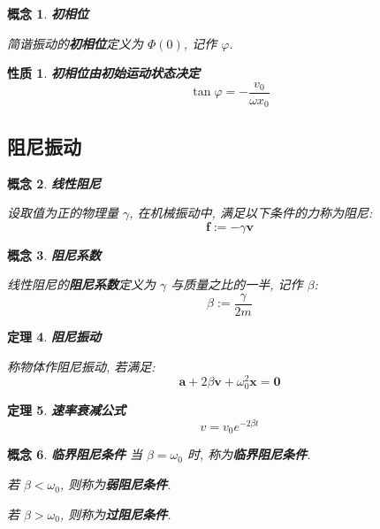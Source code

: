 \documentclass[UTF8]{ctexart}
\newcommand{\<}{\langle}
\renewcommand{\>}{\rangle}                              %
\newenvironment{dfn_box}{
    \begin{tcolorbox}[enhanced, colback=dfn_green2, boxrule=0pt, frame hidden,
        borderline west={0.7mm}{0.1mm}{dfn_green1},breakable]
    }
    {\end{tcolorbox}}
\newenvironment{thm_box}{
    \begin{tcolorbox}[enhanced, colback=thm_blue2, boxrule=0pt, frame hidden,
        borderline west={0.7mm}{0.1mm}{thm_blue1},breakable]
    }
    {\end{tcolorbox}}
\newenvironment{ppt_box}{
    \begin{tcolorbox}[enhanced, colback=ppt_pink2, boxrule=0pt, frame hidden,
        borderline west={0.7mm}{0.1mm}{ppt_pink1},breakable]
    }
    {\end{tcolorbox}}
\theoremstyle{MyStyle} %
\newtheorem{definition}{概念}[subsection]
\newenvironment{cpt}{\begin{dfn_box}\begin{definition}}{\end{definition}\end{dfn_box}}
\newtheorem{theorem}[definition]{定理}
\newenvironment{thm}{\begin{thm_box}\begin{theorem}}{\end{theorem}\end{thm_box}}
\newtheorem{property}{性质}[definition]
\newenvironment{ppt}{\begin{ppt_box}\begin{property}}{\end{property}\end{ppt_box}}
\begin{document}
            \begin{cpt}
                \textbf{初相位}

                简谐振动的\textbf{初相位}定义为 \(\Phi(0)\), 记作 \(\varphi\). 
            \end{cpt}
            
            \begin{ppt}
                \textbf{初相位由初始运动状态决定}
                \[\tan\varphi=-\frac{v_0}{\omega x_0}\]
            \end{ppt}

        \subsection{阻尼振动}
            
            \begin{cpt}
                \textbf{线性阻尼}

                设取值为正的物理量 \(\gamma\), 在机械振动中, 满足以下条件的力称为阻尼: 
                \[\bm{f}:=-\gamma\bm{v}\]
            \end{cpt}
            
            \begin{cpt}
                \textbf{阻尼系数}

                线性阻尼的\textbf{阻尼系数}定义为 \(\gamma\) 与质量之比的一半, 记作 \(\beta\): 
                \[\beta:=\frac{\gamma}{2m}\]
            \end{cpt}
            
            \begin{thm}
                \textbf{阻尼振动}

                称物体作阻尼振动, 若满足: 
                \[\bm{a}+2\beta\bm{v}+\omega_0^2\bm{x}=\bm{0}\]
            \end{thm}
            
            \begin{thm}
                \textbf{速率衰减公式}
                \[v=v_0 e^{-2\beta t}\]
            \end{thm}
            
            \begin{cpt}
                \textbf{临界阻尼条件}
                当 \(\beta=\omega_0\) 时, 称为\textbf{临界阻尼条件}. 

                若 \(\beta<\omega_0\), 则称为\textbf{弱阻尼条件}. 

                若 \(\beta>\omega_0\), 则称为\textbf{过阻尼条件}. 
            \end{cpt}
            
\end{document}
